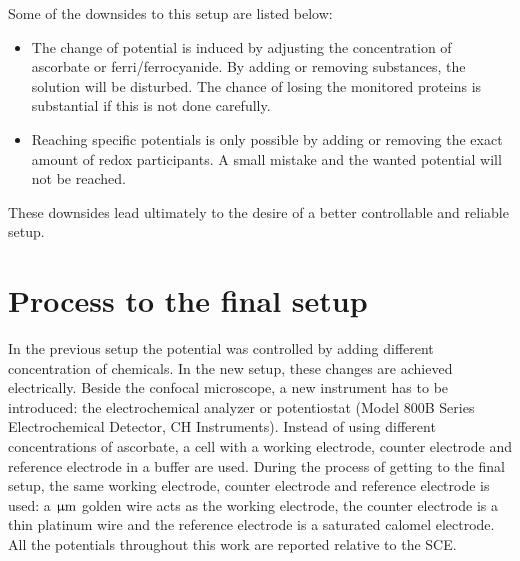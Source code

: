 \documentclass[twoside,single]{lion-msc}
\begin{document}
Some of the downsides to this setup are listed below:
\begin{itemize}
\item The change of potential is induced by adjusting the concentration of ascorbate or ferri/ferrocyanide. By adding or removing substances, the solution will be disturbed. The chance of losing the monitored proteins is substantial if this is not done carefully. 
\item Reaching specific potentials is only possible by adding or removing the exact amount of redox participants. A small mistake and the wanted potential will not be reached. 
\end{itemize}

These downsides lead ultimately to the desire of a better controllable and reliable setup. 

\section{Process to the final setup}

In the previous setup the potential was controlled by adding different concentration of chemicals. In the new setup, these changes are achieved electrically. Beside the confocal microscope, a new instrument has to be introduced: the electrochemical analyzer or potentiostat (Model 800B Series Electrochemical Detector, CH Instruments). Instead of using different concentrations of ascorbate, a cell with a working electrode, counter electrode and reference electrode in a buffer are used. During the process of getting to the final setup, the same working electrode, counter electrode and reference electrode is used: a $\upmu \textup{m}$ golden wire acts as the working electrode, the counter electrode is a  thin platinum wire and the reference electrode is a saturated calomel electrode. All the potentials throughout this work are reported relative to the SCE.
\end{document}

